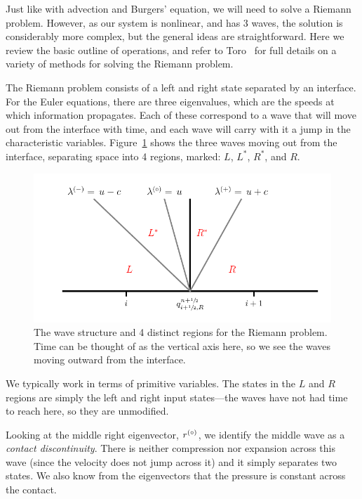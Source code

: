 Just like with advection and Burgers' equation, we will need to solve
a Riemann problem.  However, as our system is nonlinear, and has 3
waves, the solution is considerably more complex, but the general
ideas are straightforward.  Here we review the basic outline of
operations, and refer to Toro~\cite{toro:1997} for full details on a
variety of methods for solving the Riemann problem.

The Riemann problem consists of a left and right state separated by an
interface.  For the Euler equations, there are three eigenvalues,
which are the speeds at which information propagates.  Each of these
correspond to a wave that will move out from the interface with time,
and each wave will carry with it a jump in the characteristic
variables.  Figure~\ref{fig:riemann:waves} shows the
three waves moving out from the interface, separating space into 4
regions, marked: $L$, $L^*$, $R^*$, and $R$.
\begin{figure}[h]
\centering
\includegraphics[width=\linewidth]{riemann-waves}
\caption[The Riemann problem wave structure for the Euler
  equations]{\label{fig:riemann:waves} The wave structure and 4
  distinct regions for the Riemann problem.  Time can be thought of as
  the vertical axis here, so we see the waves moving outward from the
  interface.}
\end{figure}
We typically work in terms of primitive variables.  The states in the
$L$ and $R$ regions are simply the left and right input states---the
waves have not had time to reach here, so they are unmodified.

Looking at the middle right eigenvector, $r^{(\circ)}$, we identify the
middle wave as a {\em contact discontinuity}.  There is neither
compression nor expansion across this wave (since the velocity does
not jump across it) and it simply separates two states.  We also know
from the eigenvectors that the pressure is constant across the
contact.

